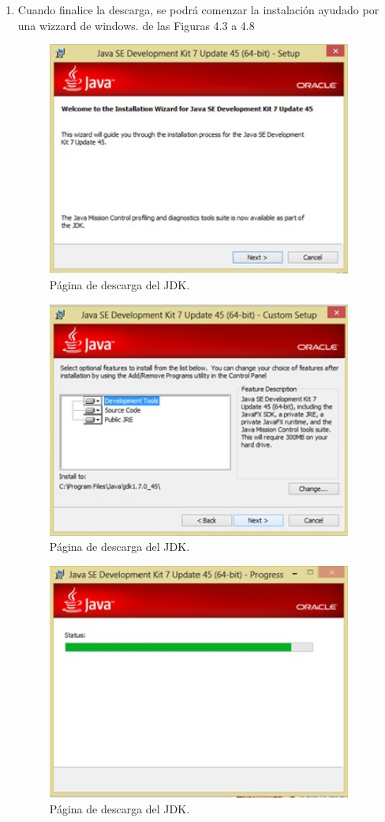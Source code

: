 \documentclass[12pt]{book} %
\begin{document}
\begin{enumerate}
\begin{figure}[h]
	\end{figure}

\item Cuando finalice la descarga, se podr\'a comenzar la instalaci\'on ayudado por una wizzard de windows. de las Figuras 4.3 a 4.8

	\begin{figure}[h!]
		\centering
			\includegraphics[width=10cm]{ins3.jpg}
			\caption{P\'agina de descarga del JDK.}
		
	\end{figure}
	\begin{figure}[h!]
		\centering
			\includegraphics[width=10cm]{ins4.jpg}
			\caption{P\'agina de descarga del JDK.}
		
	\end{figure}
	\begin{figure}[h!]
		\centering
			\includegraphics[width=10cm]{ins5.jpg}
			\caption{P\'agina de descarga del JDK.}
		

\end{figure}
\end{enumerate}
\end{document}

